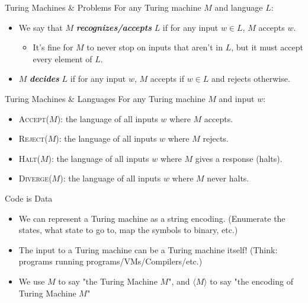 \documentclass[aspectratio=169, handout]{beamer}
\newcommand{\inst}[1]{\langle #1 \rangle}
\begin{document}
\begin{frame}{Turing Machines \& Problems}
For any Turing machine $M$ and language $L$:
    \begin{itemize}
        \item We say that $M$ \textbf{\textit{recognizes/accepts}} $L$ if for any input $w\in L$, $M$ accepts $w$. \pause
        \begin{itemize}
            \item It's fine for $M$ to never stop on inputs that aren't in $L$, but it must accept every element of $L$. \pause
        \end{itemize}
        \item $M$ \textbf{\textit{decides}} $L$ if for any input $w$, $M$ accepts if $w \in L$ and rejects otherwise.
    \end{itemize}
\end{frame}

\begin{frame}{Turing Machines \& Languages}
For any Turing machine $M$ and input $w$:
    \begin{itemize}
        \item \textsc{Accept($M$)}: the language of all inputs $w$ where $M$ accepts. \pause
        \item \textsc{Reject($M$)}: the language of all inputs $w$ where $M$ rejects. \pause
        \item \textsc{Halt($M$)}: the language of all inputs $w$ where $M$ gives a response (halts). \pause
        \item \textsc{Diverge($M$)}: the language of all inputs $w$ where $M$ never halts.
    \end{itemize}
\end{frame}

\begin{frame}{Code is Data}
\begin{itemize}
    \item We can represent a Turing machine as a string encoding. (Enumerate the states, what state to go to, map the symbols to binary, etc.) \pause
    
    \item The input to a Turing machine can be a Turing machine itself! (Think: programs running programs/VMs/Compilers/etc.) \pause
    
    \item We use $M$ to say "the Turing Machine $M$", and $\inst{M}$ to say "the encoding of Turing Machine $M$"
\end{itemize}
\end{frame}
\end{document}
